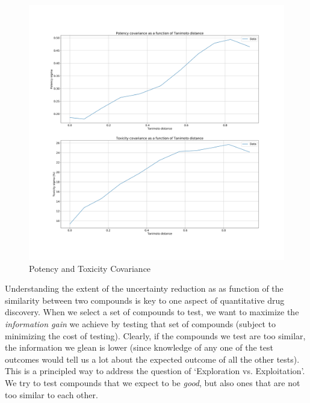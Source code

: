 \documentclass{article}
\begin{document}
\begin{figure}[h!]
\centering
\includegraphics[width=\textwidth]{fig3_covariance.jpg}
\caption{Potency and Toxicity Covariance}
\label{fig:cov}
\end{figure}
Understanding the extent of the uncertainty reduction as as function of the similarity between two compounds is key to one aspect of quantitative drug discovery.  When we select a set of compounds to test, we want to maximize the \textit{information gain} we achieve by testing that set of compounds (subject to minimizing the cost of testing).  Clearly, if the compounds we test are too similar, the information we glean is lower (since knowledge of any one of the test outcomes would tell us a lot about the expected outcome of all the other tests).  This is a principled way to address the question of `Exploration vs. Exploitation'.  We try to test compounds that we expect to be \textit{good}, but also ones that are not too similar to each other.
\end{document}
